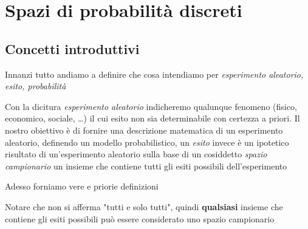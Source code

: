 % 
\newcommand{\assiomalabel}[1]{\refstepcounter{assiomacounter}\label{#1}\textbf{Assioma \theassiomacounter.}}

\chapter{Spazi di probabilità discreti}
\section{Concetti introduttivi}
Innanzi tutto andiamo a definire che cosa intendiamo per \textit{esperimento aleatorio, esito, probabilità}

Con la dicitura \textit{esperimento aleatorio} indicheremo qualunque fenomeno (fisico, economico, sociale, \dots ) il cui esito non sia determinabile con certezza a priori. Il nostro obiettivo è di fornire una descrizione matematica di un esperimento aleatorio, definendo un modello probabilistico, un \textit{esito} invece è un ipotetico risultato di un'esperimento aleatorio sulla base di un cosiddetto \textit{spazio campionario} un insieme che contiene tutti gli esiti possibili dell’esperimento



Adesso forniamo vere e priorie definizioni


Notare che non si afferma "tutti e solo tutti", quindi \textbf{qualsiasi} insieme che contiene gli esiti possibili può essere considerato uno spazio campionario

